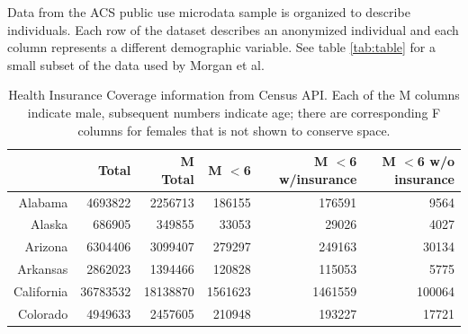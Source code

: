 \documentclass{article}\usepackage[]{graphicx}\usepackage[]{color}
\begin{document}
Data from the ACS public use microdata sample is organized to describe individuals.  Each row of the dataset describes an anonymized individual and each column represents a different demographic variable.  See table \ref{tab:table} for a small subset of the data used by Morgan et al.\\
\begin{table}[ht]
\centering
\begin{tabular}{rrrrrr}
  \hline
 & Total & M Total & M $<$6 & M $<$6 w/insurance & M $<$6 w/o insurance \\ 
  \hline
Alabama & 4693822 & 2256713 & 186155 & 176591 & 9564 \\ 
  Alaska & 686905 & 349855 & 33053 & 29026 & 4027 \\ 
  Arizona & 6304406 & 3099407 & 279297 & 249163 & 30134 \\ 
  Arkansas & 2862023 & 1394466 & 120828 & 115053 & 5775 \\ 
  California & 36783532 & 18138870 & 1561623 & 1461559 & 100064 \\ 
  Colorado & 4949633 & 2457605 & 210948 & 193227 & 17721 \\ 
   \hline
\end{tabular}
\caption{Health Insurance Coverage information from Census API.  Each of the M columns indicate male, subsequent numbers indicate age; there are corresponding F columns for females that is not shown to conserve space.} 
\label{fig:example}
\end{table}
\end{document}
